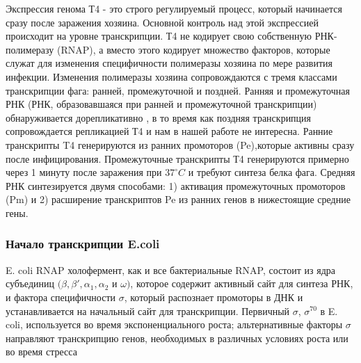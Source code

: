 \documentclass[14pt]{extarticle}
\begin{document}
        \par{Экспрессия генома Т4 - это строго регулируемый процесс, который начинается сразу после заражения хозяина. 
        Основной контроль над этой экспрессией происходит на уровне транскрипции. Т4 не кодирует свою собственную 
        РНК-полимеразу (RNAP), а вместо этого кодирует множество факторов, которые служат для изменения специфичности 
        полимеразы хозяина по мере развития инфекции. Изменения полимеразы хозяина сопровождаются с тремя классами 
        транскрипции фага: ранней, промежуточной и поздней. Ранняя и промежуточная РНК (РНК, образовавшаяся при ранней и
        промежуточной транскрипции) обнаруживается дорепликативно 
        \cite{hinton1,hinton2,hinton3,hinton4,hinton5,hinton6}, в то время как поздняя транскрипция сопровождается 
        репликацией Т4 и нам в нашей работе не интересна. Ранние транскрипты T4 генерируются из ранних промоторов 
        (Pe),которые активны сразу после инфицирования. Промежуточные транскрипты Т4 генерируются примерно через 1 
        минуту после заражения при \(37^\circ C\) и требуют синтеза белка фага. Средняя РНК синтезируется двумя 
        способами: 1) активация промежуточных промоторов (Pm) и 2) расширение транскриптов Pe из ранних генов в 
        нижестоящие средние гены.}
        
        \begin{center}
        \item \subsubsection {Начало транскрипции E.coli}
        \end{center}
        
        \par{E. coli RNAP холофермент, как и все бактериальные RNAP, состоит из ядра субъединиц 
        \((\beta,\beta',\alpha_1,\alpha_2\) и \(\omega)\), которое содержит активный сайт для синтеза РНК, и фактора 
        специфичности \(\sigma\), который распознает промоторы в ДНК и устанавливается на начальный сайт для 
        транскрипции. Первичный \(\sigma\), \(\sigma^{70}\) в E. coli, используется во время экспоненциального роста; 
        альтернативные факторы \(\sigma\) направляют транскрипцию генов, необходимых в различных условиях роста или во 
        время стресса \cite{17}}
        
\end{document}
